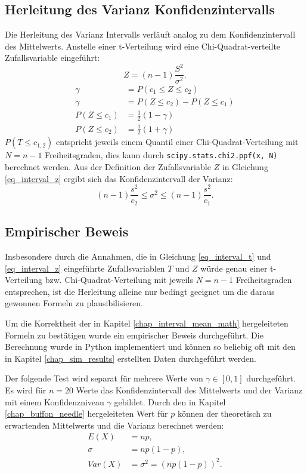 \documentclass[10pt,twocolumn]{scrartcl}
\begin{document}
	\subsection{Herleitung des Varianz Konfidenzintervalls}
		\label{chap_interval_var_math}
		Die Herleitung des Varianz Intervalls verläuft analog zu dem Konfidenzintervall  des Mittelwerts. Anstelle einer t-Verteilung wird eine Chi-Quadrat-verteilte Zufallsvariable eingeführt:
		\begin{equation} \label{eq_interval_z}
		Z = (n-1)\frac{S^2}{\sigma^2} .
		\end{equation}
		\begin{align}
		\gamma &= P(c_1 \le Z \le c_2) \\
		\gamma &= P(Z \le c_2) - P(Z \le c_1) \nonumber \\
		P(Z \le c_1) &= \frac{1}{2} (1-\gamma) \\
		P(Z \le c_2) &= \frac{1}{2} (1+\gamma)
		\end{align}
		$P(T \le c_{1,2})$ entspricht jeweils einem Quantil einer Chi-Quadrat-Verteilung mit $N = n-1$ Freiheitsgraden, dies kann durch \texttt{scipy.stats.chi2.ppf(x, N)}\cite{scipy} berechnet werden.
		Aus der Definition der Zufallsvariable $Z$ in Gleichung \ref{eq_interval_z} ergibt sich das Konfidenzintervall der Varianz:
		\begin{equation}
		(n-1)  \frac{s^2}{c_2} \le \sigma^2 \le (n-1)  \frac{s^2}{c_1}.
		\end{equation}

	\subsection{Empirischer Beweis}
		\label{chap_interval_prove}
		Insbesondere durch die Annahmen, die in Gleichung \ref{eq_interval_t} und \ref{eq_interval_z} eingeführte  Zufallsvariablen $T$ und $Z$ würde genau einer t-Verteilung bzw. Chi-Quadrat-Verteilung mit jeweils $N = n-1$ Freiheitsgraden entsprechen, ist die Herleitung alleine nur bedingt geeignet um die daraus gewonnen Formeln zu plausibilisieren.

		Um die Korrektheit der in Kapitel \ref{chap_interval_mean_math} hergeleiteten Formeln zu bestätigen wurde ein empirischer Beweis durchgeführt. Die Berechnung wurde in Python implementiert und können so beliebig oft mit den in Kapitel \ref{chap_sim_results} erstellten Daten durchgeführt werden.

		Der folgende Test wird separat für mehrere Werte von $\gamma \in [0, 1]$ durchgeführt. Es wird für $n = 20$ Werte das Konfidenzintervall des Mittelwerts und der Varianz mit einem Konfidenzniveau $\gamma$ gebildet. Durch den in Kapitel \ref{chap_buffon_needle} hergeleiteten Wert für $p$ können der theoretisch zu erwartenden Mittelwerts und die Varianz berechnet  werden:
		\begin{align}
		E(X) &= n p , \\
		\sigma &= n p (1-p) , \nonumber \\
		Var(X) &= \sigma^2 = (n p (1-p))^2 .
		\end{align}
\end{document}
